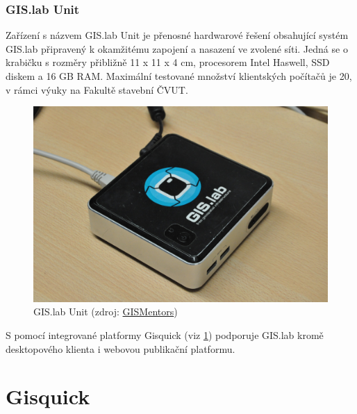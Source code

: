 \subsubsection{GIS.lab Unit}
\label{gislab-unit}
Zařízení s názvem GIS.lab Unit je přenosné hardwarové řešení
obsahující systém GIS.lab připravený k okamžitému zapojení a nasazení
ve zvolené síti. Jedná se o krabičku s rozměry přibližně 11 x 11 x 4
cm, procesorem Intel Haswell, SSD diskem a 16 GB RAM. Maximální
testované množství klientských počítačů je 20, v rámci výuky na Fakultě stavební ČVUT.

\begin{figure}[H] \centering
    \includegraphics[width=350pt]{./pictures/gislab-unit.jpg}
    \caption[GIS.lab Unit]{GIS.lab Unit (zdroj:
	\href{http://gismentors.cz/wp-content/uploads/2018/12/DSC_0043.jpg}{GISMentors})}
    \label{fig:gislab-unit}
\end{figure}

S pomocí integrované platformy Gisquick (viz \ref{gisquick}) podporuje
GIS.lab kromě desktopového klienta i webovou publikační platformu.

\section{Gisquick}
\label{gisquick}

